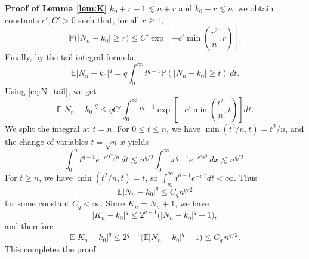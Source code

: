 \documentclass[10pt,a4paper]{amsart}
\renewenvironment{proof}[1]{\par\medskip\noindent\textbf{#1}\enspace\ignorespaces}{\par\medskip}
\def\E{\mathbb{E}}%
\def\P{\mathbb{P}}
\begin{document}
\begin{proof}{Proof of Lemma \ref{lem:K}}
\(k_0+r-1\lesssim n+r\) and \(k_0-r\lesssim n\), we obtain constants
\(c',C'>0\) such that, for all \(r\ge1\),
\begin{equation}\label{eq:N_tail}
\P\bigl(|N_n-k_0|\ge r\bigr)
\le
C'\exp\!\left[-c'\min\!\left(\frac{r^2}{n},r\right)\right].
\end{equation}
Finally, by the tail-integral formula,
\[
\E|N_n-k_0|^q
=
q\int_0^\infty t^{q-1}\P(|N_n-k_0|\ge t)\,dt.
\]
Using \eqref{eq:N_tail}, we get
\[
\E|N_n-k_0|^q
\le
qC'\int_0^\infty t^{q-1}
\exp\!\left[-c'\min\!\left(\frac{t^2}{n},t\right)\right]dt.
\]
We split the integral at \(t=n\). For \(0\le t\le n\), we have
\(\min(t^2/n,t)=t^2/n\), and the change of variables \(t=\sqrt n\,x\) yields
\[
\int_0^n t^{q-1}e^{-c't^2/n}\,dt
\lesssim
n^{q/2}\int_0^\infty x^{q-1}e^{-c'x^2}\,dx
\lesssim
n^{q/2}.
\]
For \(t\ge n\), we have \(\min(t^2/n,t)=t\), so $\int_n^\infty t^{q-1}e^{-c't}dt<\infty.$ Thus 
\[
\E|N_n-k_0|^q\le \widetilde C_q n^{q/2}
\]
for some constant \(\widetilde C_q<\infty\). Since \(K_n=N_n+1\), we have
\[
|K_n-k_0|^q\le 2^{q-1}\bigl(|N_n-k_0|^q+1\bigr),
\]
and therefore
\[
\E|K_n-k_0|^q
\le
2^{q-1}\bigl(\E|N_n-k_0|^q+1\bigr)
\le
C_q\, n^{q/2}.
\]
This completes the proof.
\end{proof}
\end{document}
